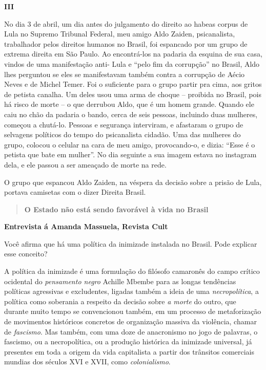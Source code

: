 \textbf{III}

No dia 3 de abril, um dia antes do julgamento do direito ao habeas
corpus de Lula no Supremo Tribunal Federal, meu amigo Aldo Zaiden,
psicanalista, trabalhador pelos direitos humanos no Brasil, foi
espancado por um grupo de extrema direita em São Paulo. Ao encontrá-los
na padaria da esquina de sua casa, vindos de uma manifestação anti- Lula
e ``pelo fim da corrupção'' no Brasil, Aldo lhes perguntou se eles se
manifestavam também contra a corrupção de Aécio Neves e de Michel Temer.
Foi o suficiente para o grupo partir pra cima, aos gritos de petista
canalha. Um deles usou uma arma de choque -- proibida no Brasil, pois há
risco de morte -- o que derrubou Aldo, que é um homem grande. Quando ele
caiu no chão da padaria o bando, cerca de seis pessoas, incluindo duas
mulheres, começou a chutá-lo. Pessoas e segurança interviram, e
afastaram o grupo de selvagens políticos do tempo do psicanalista
cidadão. Uma das mulheres do grupo, colocou o celular na cara de meu
amigo, provocando-o, e dizia: ``Esse é o petista que bate em mulher''.
No dia seguinte a sua imagem estava no instagram dela, e ele passou a
ser ameaçado de morte na rede.

O grupo que espancou Aldo Zaiden, na véspera da decisão sobre a prisão
de Lula, portava camisetas com o dizer Direita Brasil.

\begin{quote}
\textbf{O Estado não está sendo favorável à vida no Brasil}
\end{quote}

\textbf{Entrevista á Amanda Massuela, Revista Cult}

Você afirma que há uma política da inimizade instalada no Brasil. Pode
explicar esse conceito?

A política da inimizade é uma formulação do filósofo camaronês do campo
crítico ocidental do \emph{pensamento negro} Achille Mbembe para as
longas tendências políticas agressivas e excludentes, ligadas também a
ideia de uma \emph{necropolítica}, a política como soberania a respeito
da decisão sobre \emph{a morte} do outro, que durante muito tempo se
convencionou também, em um processo de metaforização de movimentos
históricos concretos de organização massiva da violência, chamar de
\emph{fascismo}. Mas também, com uma doze de anacronismo no jogo de
palavras, o fascismo, ou a necropolítica, ou a produção histórica da
inimizade universal, já presentes em toda a origem da vida capitalista a
partir dos trânsitos comerciais mundias dos séculos XVI e XVII, como
\emph{colonialismo}.

